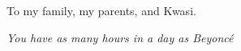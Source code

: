 %
\begin{frontmatter}

%
%
\makefrontmatter

%
%
%
%
%
%
\begin{dedication}
  To my family, my parents, and Kwasi.
\end{dedication}


%
%



%
%
\begin{epigraph} %
  \emph{You have as many hours in a day as Beyonc\'e}
\end{epigraph}

%


%
\tableofcontents
\listoffigures  %
\listoftables   %




\end{frontmatter}
